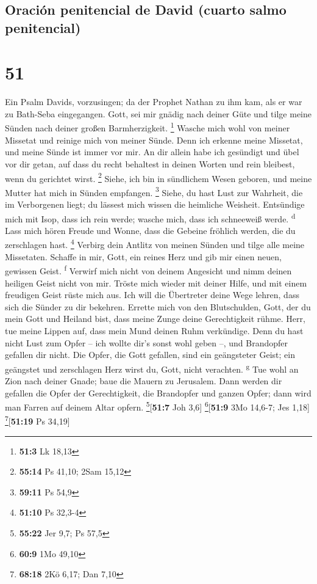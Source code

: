 \hypertarget{oraciuxf3n-penitencial-de-david-cuarto-salmo-penitencial}{%
\subsection{Oración penitencial de David (cuarto salmo
penitencial)}\label{oraciuxf3n-penitencial-de-david-cuarto-salmo-penitencial}}

\hypertarget{section-50}{%
\section{51}\label{section-50}}

 Ein Psalm Davids, vorzusingen;  da der
Prophet Nathan zu ihm kam, als er war zu Bath-Seba eingegangen.
 Gott, sei mir gnädig nach deiner Güte und tilge meine
Sünden nach deiner großen Barmherzigkeit. \footnote{\textbf{51:3} Lk
  18,13}  Wasche mich wohl von meiner Missetat und reinige
mich von meiner Sünde.  Denn ich erkenne meine Missetat,
und meine Sünde ist immer vor mir.  An dir allein habe ich
gesündigt und übel vor dir getan, auf dass du recht behaltest in deinen
Worten und rein bleibest, wenn du gerichtet wirst. \footnote{\textbf{55:14}
  Ps 41,10; 2Sam 15,12}  Siehe, ich bin in sündlichem
Wesen geboren, und meine Mutter hat mich in Sünden empfangen.
\footnote{\textbf{59:11} Ps 54,9}  Siehe, du hast Lust zur
Wahrheit, die im Verborgenen liegt; du lässest mich wissen die heimliche
Weisheit.  Entsündige mich mit Isop, dass ich rein werde;
wasche mich, dass ich schneeweiß werde. \textsuperscript{d}
 Lass mich hören Freude und Wonne, dass die Gebeine
fröhlich werden, die du zerschlagen hast. \footnote{\textbf{51:10} Ps
  32,3-4}  Verbirg dein Antlitz von meinen Sünden und
tilge alle meine Missetaten.  Schaffe in mir, Gott, ein
reines Herz und gib mir einen neuen, gewissen Geist. \textsuperscript{f}
 Verwirf mich nicht von deinem Angesicht und nimm deinen
heiligen Geist nicht von mir.  Tröste mich wieder mit
deiner Hilfe, und mit einem freudigen Geist rüste mich aus.
 Ich will die Übertreter deine Wege lehren, dass sich die
Sünder zu dir bekehren.  Errette mich von den
Blutschulden, Gott, der du mein Gott und Heiland bist, dass meine Zunge
deine Gerechtigkeit rühme.  Herr, tue meine Lippen auf,
dass mein Mund deinen Ruhm verkündige.  Denn du hast
nicht Lust zum Opfer -- ich wollte dir's sonst wohl geben --, und
Brandopfer gefallen dir nicht.  Die Opfer, die Gott
gefallen, sind ein geängsteter Geist; ein geängstet und zerschlagen Herz
wirst du, Gott, nicht verachten. \textsuperscript{g}  Tue
wohl an Zion nach deiner Gnade; baue die Mauern zu Jerusalem.
 Dann werden dir gefallen die Opfer der Gerechtigkeit,
die Brandopfer und ganzen Opfer; dann wird man Farren auf deinem Altar
opfern. \footnote{\textbf{55:22} Jer 9,7; Ps 57,5}{[}\textbf{51:7} Joh
3,6{]} \footnote{\textbf{60:9} 1Mo 49,10}{[}\textbf{51:9} 3Mo 14,6-7;
Jes 1,18{]} \footnote{\textbf{68:18} 2Kö 6,17; Dan 7,10}{[}\textbf{51:19}
Ps 34,19{]}

